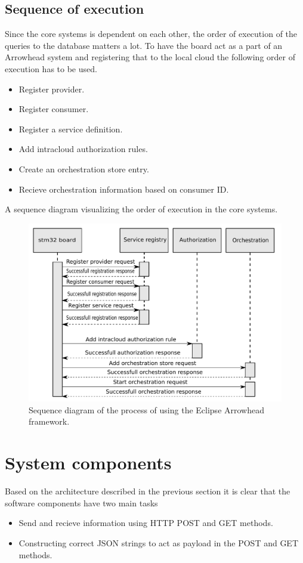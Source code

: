 \subsection{Sequence of execution}
Since the core systems is dependent on each other, the order of execution of the queries to the database matters a lot.
To have the board act as a part of an Arrowhead system and registering that to the local cloud the following order of execution has to be used.
\begin{itemize}
    \item Register provider.
    \item Register consumer.
    \item Register a service definition.
    \item Add intracloud authorization rules.
    \item Create an orchestration store entry.
    \item Recieve orchestration information based on consumer ID.
\end{itemize}
A sequence diagram visualizing the order of execution in the core systems.
\begin{figure}[H]
    \centering
    \includegraphics[width=\textwidth]{Pictures/sequence_diagram_total.pdf} 
    \caption{Sequence diagram of the process of using the Eclipse Arrowhead framework.}
    \label{sequence diagram whole process}
\end{figure}

\section{System components}
Based on the architecture described in the previous section it is clear that the software components have two main tasks
\begin{itemize}
    \item Send and recieve information using HTTP POST and GET methods.
    \item Constructing correct JSON strings to act as payload in the POST and GET methods. 
\end{itemize}
